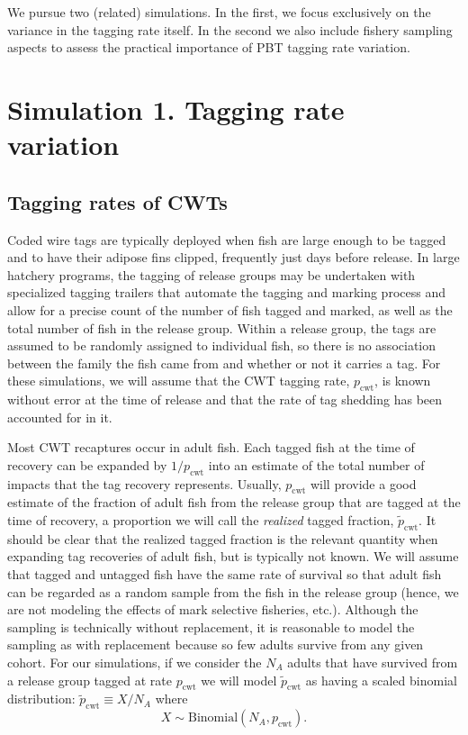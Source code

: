\documentclass[11pt]{article}
\begin{document}
We pursue two (related) simulations.  In the first, we focus  exclusively on the
variance in the tagging rate itself.  In the second we also include fishery sampling
aspects to assess the practical importance of PBT tagging rate variation.

\section{Simulation 1. Tagging rate variation}

\subsection{Tagging rates of CWTs}
Coded wire tags are typically deployed
when fish are large enough to be tagged and to have their adipose fins clipped, frequently
just days before release.  In large hatchery programs, the tagging of release
groups may be undertaken with specialized tagging trailers that automate the tagging and marking
process and allow for a precise count of the number of fish tagged and marked,
as well as the total number of fish in the release group.  Within a release group, the tags are
assumed to be randomly assigned to individual fish, so there is no association between the family
the fish came from and whether or not it carries a tag.  For these simulations, we will assume
that the CWT tagging rate, $p_\mathrm{cwt}$, is known without error at the time of release and that
the rate of tag shedding has been accounted for in it. 

Most CWT recaptures occur in adult fish.  Each tagged fish at the time of recovery can be
expanded by $1/p_\mathrm{cwt}$ into an estimate of the total number of impacts that the tag recovery represents.
Usually, $p_\mathrm{cwt}$ will provide a good estimate of the fraction of adult fish from the release group
that are tagged at the time of recovery, a proportion we will call the {\em realized} tagged
fraction, $\tilde{p}_\mathrm{cwt}$.  It should be clear that the realized
tagged fraction is the relevant quantity when expanding
tag recoveries of adult fish, but is typically not known.  
We will assume that tagged and untagged fish have the same rate of
survival so that adult fish can be regarded as a random sample from the fish in the release group (hence,
we are not modeling the
effects of mark selective fisheries, etc.).
Although the sampling is technically without replacement, it is reasonable to model the sampling as
with replacement because so few adults survive from any given cohort.  For our simulations, if we consider the
$N_A$ adults that have survived from a release group tagged at rate $p_\mathrm{cwt}$  we will
model $\tilde{p}_\mathrm{cwt}$ as having a scaled binomial distribution:
$	\tilde{p}_\mathrm{cwt} \equiv X/N_A$ where 
\[
X \sim \mathrm{Binomial}(N_A, p_\mathrm{cwt}).
\]
\end{document}
